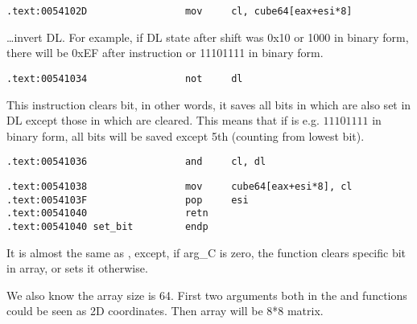 
\begin{lstlisting}
.text:0054102D                 mov     cl, cube64[eax+esi*8]
\end{lstlisting}

{\dots invert DL. For example, if DL state after shift was 0x10 or 1000 in binary form, 
there will be 0xEF after \NOT instruction or 11101111 in binary form.}

\begin{lstlisting}
.text:00541034                 not     dl
\end{lstlisting}

{This instruction clears bit, in other words, it saves all bits in  which are also set in 
DL except those in  which are cleared.
This means that if  is e.g. $11101111$ in binary form,
all bits will be saved except 5th (counting from lowest bit).}

\begin{lstlisting}
.text:00541036                 and     cl, dl
\end{lstlisting}


\begin{lstlisting}
.text:00541038                 mov     cube64[eax+esi*8], cl
.text:0054103F                 pop     esi
.text:00541040                 retn
.text:00541040 set_bit         endp
\end{lstlisting}

{It is almost the same as , except, if arg\_C is zero, the function clears specific bit in array, 
or sets it otherwise.}

{We also know the array size is 64. First two arguments both in the  and  functions
could be seen as 2D coordinates. Then array will be 8*8 matrix.}

